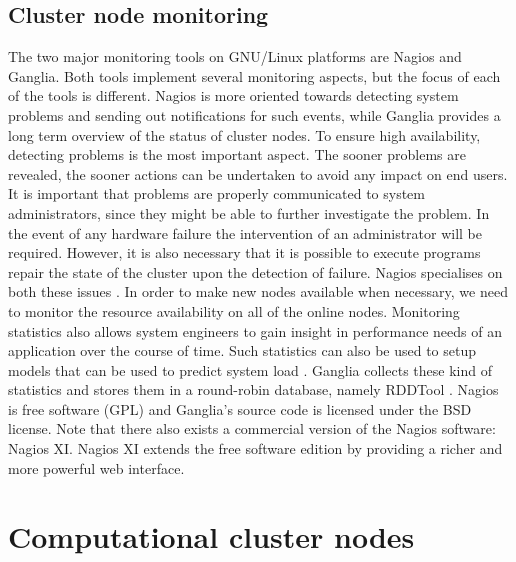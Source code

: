 \documentclass[12pt]{report}
\begin{document}
\subsection{Cluster node monitoring}
The two major monitoring tools on GNU/Linux platforms are Nagios and
Ganglia. Both tools implement several monitoring aspects, but the
focus of each of the tools is different. Nagios is more oriented
towards detecting system problems and sending out notifications for
such events, while Ganglia provides a long term overview of the status
of cluster nodes. To ensure high availability, detecting problems is
the most important aspect. The sooner problems are revealed, the
sooner actions can be undertaken to avoid any impact on end users. It
is important that problems are properly communicated to system
administrators, since they might be able to further investigate the
problem. In the event of any hardware failure the intervention of
an administrator will be required. However, it is also necessary that
 it is possible to execute programs repair the state of the cluster
 upon the detection of failure. Nagios specialises on both these
 issues \cite{nagios:2013}.
In order to make new nodes available when necessary, we need to
monitor the resource availability on all of the online nodes.
Monitoring statistics also allows system engineers to gain insight in
performance needs of an application over the course of time. 
Such statistics can also be used to setup models that can be used to
predict system load \cite{andreolini:2006}. Ganglia collects these
kind of statistics and stores them in a round-robin database, namely RDDTool
\cite{ganglia:2013} \cite{rrdt:2013}.
Nagios is free software (GPL) and Ganglia's source code is licensed
under the BSD license. Note that there also exists a commercial
version of the Nagios software: Nagios XI. Nagios XI extends the free
software edition by providing a richer and more powerful web interface.

\section{Computational cluster nodes}
\end{document}
